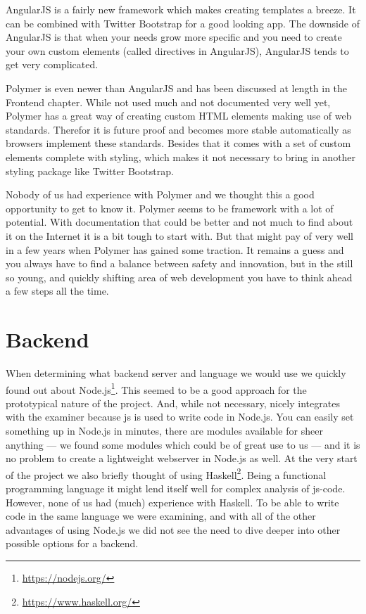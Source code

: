 AngularJS is a fairly new framework which makes creating templates a breeze.
It can be combined with Twitter Bootstrap for a good looking app.
The downside of AngularJS is that when your needs grow more specific
and you need to create your own custom elements
(called directives in AngularJS),
AngularJS tends to get very complicated.

Polymer is even newer than AngularJS
and has been discussed at length in the Frontend chapter.
While not used much and not documented very well yet,
Polymer has a great way of creating custom HTML elements
making use of web standards.
Therefor it is future proof
and becomes more stable automatically as browsers implement these standards.
Besides that it comes with a set of custom elements
complete with styling,
which makes it not necessary to bring in another styling package
like Twitter Bootstrap.

Nobody of us had experience with Polymer
and we thought this a good opportunity to get to know it.
Polymer seems to be framework with a lot of potential.
With documentation that could be better
and not much to find about it on the Internet
it is a bit tough to start with.
But that might pay of very well in a few years
when Polymer has gained some traction.
It remains a guess and you always have to find a balance
between safety and innovation,
but in the still so young, and quickly shifting area of web development
you have to think ahead a few steps all the time.

\section{Backend}
When determining what backend server and language we would use
we quickly found out about
Node.js\footnote{\url{https://nodejs.org/}}.
This seemed to be a good approach for the prototypical nature of the project.
And, while not necessary, nicely integrates with the \gls{examiner}
because \gls{js} is used to write code in Node.js.
You can easily set something up in Node.js in minutes,
there are modules available for sheer anything
--- we found some modules which could be of great use to us ---
and it is no problem to create a lightweight webserver in Node.js as well.
At the very start of the project we also briefly thought of using
Haskell\footnote{\url{https://www.haskell.org/}}.
Being a functional programming language
it might lend itself well for complex analysis of \gls{js-code}.
However, none of us had (much) experience with Haskell.
To be able to write code in the same language we were examining,
and with all of the other advantages of using Node.js
we did not see the need
to dive deeper into other possible options for a backend.

